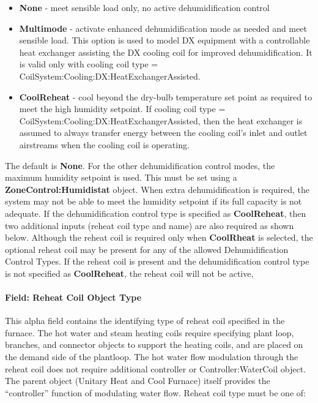 \begin{itemize}
\item
  \textbf{None} - meet sensible load only, no active dehumidification control
\item
  \textbf{Multimode} - activate enhanced dehumidification mode as needed and meet sensible load. This option is used to model DX equipment with a controllable heat exchanger assisting the DX cooling coil for improved dehumidification. It is valid only with cooling coil type = CoilSystem:Cooling:DX:HeatExchangerAssisted.
\item
  \textbf{CoolReheat} - cool beyond the dry-bulb temperature set point as required to meet the high humidity setpoint. If cooling coil type = CoilSystem:Cooling:DX:HeatExchangerAssisted, then the heat exchanger is assumed to always transfer energy between the cooling coil's inlet and outlet airstreams when the cooling coil is operating.
\end{itemize}

The default is \textbf{None}. For the other dehumidification control modes, the maximum humidity setpoint is used. This must be set using a \textbf{ZoneControl:Humidistat} object. When extra dehumidification is required, the system may not be able to meet the humidity setpoint if its full capacity is not adequate. If the dehumidification control type is specified as \textbf{CoolReheat}, then two additional inputs (reheat coil type and name) are also required as shown below. Although the reheat coil is required only when \textbf{CoolRheat} is selected, the optional reheat coil may be present for any of the allowed Dehumidification Control Types. If the reheat coil is present and the dehumidification control type is not specified as \textbf{CoolReheat}, the reheat coil will not be active,

\paragraph{Field: Reheat Coil Object Type}\label{field-reheat-coil-object-type-000}

This alpha field contains the identifying type of reheat coil specified in the furnace. The hot water and steam heating coils require specifying plant loop, branches, and connector objects to support the heating coils, and are placed on the demand side of the plantloop. The hot water flow modulation through the reheat coil does not require additional controller or Controller:WaterCoil object. The parent object (Unitary Heat and Cool Furnace) itself provides the ``controller'' function of modulating water flow. Reheat coil type must be one of:

